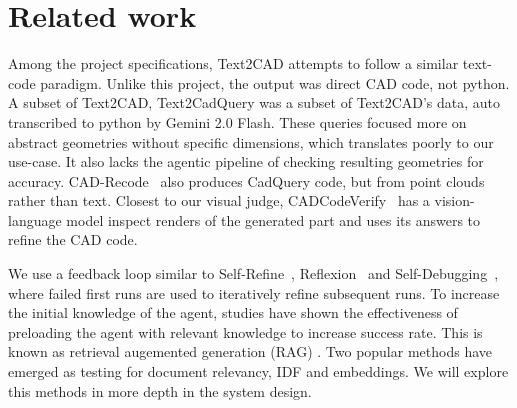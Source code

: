 \section{Related work}
\label{sec:related}



Among the project specifications, Text2CAD \cite{khan2024text2cad} attempts to follow a similar text-code paradigm.
Unlike this project, the output was direct CAD code, not python.
A subset of Text2CAD, Text2CadQuery \cite{xie2025text2cadquery} was a subset of Text2CAD's data, auto transcribed to python by Gemini 2.0 Flash.
These queries focused more on abstract geometries without specific dimensions, which translates poorly to our use-case.
It also lacks the agentic pipeline of checking resulting geometries for accuracy.
CAD-Recode~\cite{rukhovich2025cadrecode} also produces CadQuery code, but from point clouds rather than text.
Closest to our visual judge, CADCodeVerify~\cite{alrashedy2025cadcodeverify} has a vision-language model inspect renders of the generated part and uses its answers to refine the CAD code.


We use a feedback loop similar to Self-Refine~\cite{madaan2023selfrefine}, Reflexion~\cite{shinn2023reflexion} and Self-Debugging~\cite{chen2024selfdebug}, where failed first runs are used to iteratively refine subsequent runs.
To increase the initial knowledge of the agent, studies have shown the effectiveness of preloading the agent with relevant knowledge to increase success rate.
This is known as retrieval augemented generation (RAG) \cite{lewis2020rag}.
Two popular methods have emerged as testing for document relevancy, IDF and embeddings.
We will explore this methods in more depth in the system design.

